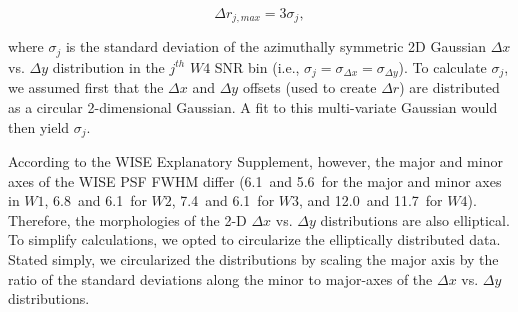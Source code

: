     \begin{equation}\label{eq:max_sep}
    \Delta r_{j,max} = 3\sigma_j,
    \end{equation}
    
    \noindent where $\sigma_j$ is the standard deviation of the azimuthally symmetric 2D Gaussian $\Delta x$ vs. $\Delta y$ distribution in the $j^{th}$ $W4$ SNR bin (i.e., $\sigma_j = \sigma_{\Delta x} = \sigma_{\Delta y}$). To calculate $\sigma_j$, we assumed first that the $\Delta x$ and $\Delta y$ offsets (used to create $\Delta r$) are distributed as a circular 2-dimensional Gaussian. A fit to this multi-variate Gaussian would then yield $\sigma_j$. 
    
    


  
  According to the WISE Explanatory Supplement, however, the major and minor axes of the WISE PSF FWHM differ (6.1\arcsec\ and 5.6\arcsec\ for the major and minor axes in $W1$, 6.8\arcsec\ and 6.1\arcsec\ for $W2$, 7.4\arcsec\ and 6.1\arcsec\ for $W3$, and 12.0\arcsec\ and 11.7\arcsec\ for $W4$). Therefore, the morphologies of the 2-D $\Delta x$ vs. $\Delta y$ distributions are also elliptical. To simplify calculations, we opted to circularize the elliptically distributed data. %
  Stated simply, we circularized the distributions by scaling the major axis by the ratio of the standard deviations along the minor to major-axes of the $\Delta x$ vs. $\Delta y$ distributions. %
  
